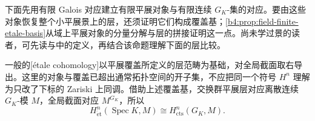 \ProseParagraphBreak
下面先用有限 Galois 对应建立有限平展对象与有限连续 \(G_K\)-集的对应。要由这些对象恢复整个小平展景上的层，还须证明它们构成覆盖基；\cref{b4:prop:field-finite-etale-basis}从域上平展对象的分量分解与层的拼接证明这一点。尚未学过景的读者，可先读与中的定义，再结合该命题理解下面的层比较。

\ProseParagraphBreak
一般的[étale cohomology]以平展覆盖所定义的层范畴为基础，对全局截面取右导出。这里的对象与覆盖已超出通常拓扑空间的开子集，不应把同一个符号 \(H^n\) 理解为只改了下标的 Zariski 上同调。借助上述覆盖基，交换群平展层对应离散连续 \(G_K\)-模 \(M\)，全局截面对应 \(M^{G_K}\)，所以
\begin{equation}\label{b4:eq:C-etale-field}
	H^n_{\mathrm{\acute et}}(\operatorname{Spec}K,M) \cong H^n_{\mathrm{cts}}(G_K,M).
\end{equation}
